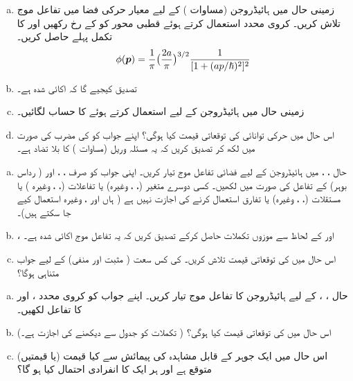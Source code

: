%
\begin{enumerate}[a.]
\item
زمینی حال میں ہائیڈروجن (مساوات ) کے لیے معیار حرکی فضا میں تفاعل موج تلاش کریں۔  کروی محدد استعمال کرتے ہوئے قطبی محور کو  کے رخ رکھیں اور  کا تکمل پہلے حاصل کریں۔  
\begin{align} 
\phi ({{\boldsymbol{p}}}) = \frac{1}{\pi} \big ( \frac{2a}{\pi} \big )^{3/2} \frac{1}{[1 + (a p/\hslash)^2]^2}
\end{align}
\item
تصدیق کیجیے گا کہ  اکائی شدہ ہے۔ 
\item
زمینی حال میں ہائیڈروجن کے لیے  استعمال کرتے ہوئے  کا حساب لگائیں۔
\item
اس حال میں حرکی توانائی کی توقعاتی قیمت کیا ہوگی؟ اپنے جواب کو  کی مضرب کی صورت میں لکھ کر تصدیق کریں کہ یہ مسئلہ وریل (مساوات ) کا بلا تضاد ہے۔
\end{enumerate}
\begin{enumerate}[a.]
\item
حال ، ،  میں ہائیڈروجن کے لیے فضائی تفاعل موج  تیار کریں۔ اپنی جواب کو صرف ، ،  اور  ( رداس بوہر) کے تفاعل کی صورت میں لکھیں۔ کسی دوسرے متغیر (، ، وغیرہ) یا تفاعلات (، ، وغیرہ ) یا مستقلات (، ، وغیرہ) یا تفارق استعمال کرنے کی اجازت نہیں ہے ( ہاں   اور ، وغیرہ استعمال کیے جا سکتے ہیں)۔ 
\item
{}،  اور  کے لحاظ سے موزوں تکملات حاصل کرکے تصدیق کریں کہ یہ تفاعل موج اکائی شدہ ہے۔ 
\item
اس حال میں  کی توقعاتی قیمت تلاش کریں۔  کی کس سعت ( مثبت اور منفی) کے لیے جواب متناہی ہوگا؟
\end{enumerate}
\begin{enumerate}[a.]
\item
حال ، ،  کے لیے ہائیڈروجن کا تفاعل موج تیار کریں۔ اپنے جواب کو کروی محدد ،  اور  کا تفاعل لکھیں۔
\item
 اس حال میں  کی توقعاتی قیمت کیا ہوگی؟ ( تکملات کو جدول سے دیکھنے کی اجازت ہے۔) 
\item
اس حال میں ایک جوہر کے قابل مشاہدہ  کی پیمائش سے کیا قیمت (یا قیمتیں) متوقع ہے اور ہر ایک کا انفرادی احتمال کیا ہو گا؟ 
\end{enumerate}
